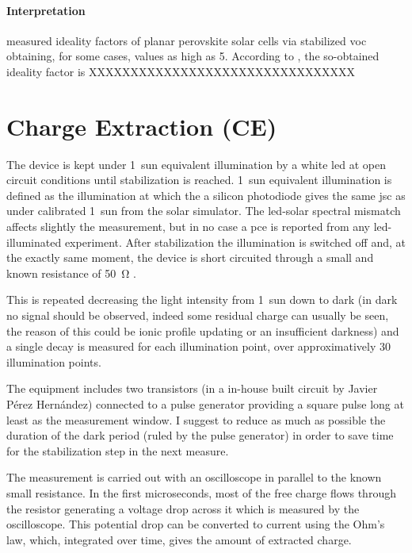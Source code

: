		\paragraph{Interpretation} %
		 measured ideality factors of planar perovskite solar cells via stabilized \gls{voc} obtaining, for some cases, values as high as 5. According to , the so-obtained ideality factor is XXXXXXXXXXXXXXXXXXXXXXXXXXXXXXXX

\section{Charge Extraction (CE)}

	The device is kept under 1~sun equivalent illumination by a white \gls{led} at open circuit conditions until stabilization is reached. 1~sun equivalent illumination is defined as the illumination at which the a silicon photodiode gives the same \gls{jsc} as under calibrated 1~sun from the solar simulator. The \gls{led}-solar spectral mismatch affects slightly the measurement, but in no case a \gls{pce} is reported from any \gls{led}-illuminated experiment. After stabilization the illumination is switched off and, at the exactly same moment, the device is short circuited through a small and known resistance of \SI{50}{\ohm} \cite{Duffy2000}.

	This is repeated decreasing the light intensity from 1~sun down to dark (in dark no signal should be observed, indeed some residual charge can usually be seen, the reason of this could be ionic profile updating or an insufficient darkness) and a single decay is measured for each illumination point, over approximatively 30 illumination points.

	The equipment includes two transistors (in a in-house built circuit by Javier Pérez Hernández) connected to a pulse generator providing a square pulse long at least as the measurement window. I suggest to reduce as much as possible the duration of the dark period (ruled by the pulse generator) in order to save time for the stabilization step in the next measure.

	The measurement is carried out with an oscilloscope in parallel to the known small resistance. In the first microseconds, most of the free charge flows through the resistor generating a voltage drop across it which is measured by the oscilloscope. This potential drop can be converted to current using the Ohm's law, which, integrated over time, gives the amount of extracted charge.

